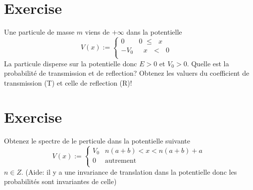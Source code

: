 \documentclass[12pt, a4paper]{article}
\begin{document}
\section{Exercise}
\par Une particule de masse $m$ viens de $+\infty$ dans la potentielle
\begin{equation*}
V(x) := \begin{cases}
	0 & \text{0 $\leq$ $x$} \\
	-V_{0} & \text{ $x$ $<$ $0$ } \\
\end{cases}
\end{equation*}
La particule disperse sur la potentielle donc $E > 0$ et $V_{0} > 0$. Quelle est la probabilité de transmission et de reflection? Obtenez les valuers
du coefficient de transmission (T) et celle de reflection (R)!
\section{Exercise}
\par Obtenez le spectre de le perticule dans la potentielle suivante
\begin{equation*}
V(x) := \begin{cases}
	V_{0} & n(a+b) < x < n(a+b) + a \\
	0 & \text{autrement}  \\
\end{cases}
\end{equation*}
$n \in Z$. (Aide: il y a une invariance de translation dans la potentielle donc les probabilités sont invariantes de celle)
\end{document}
